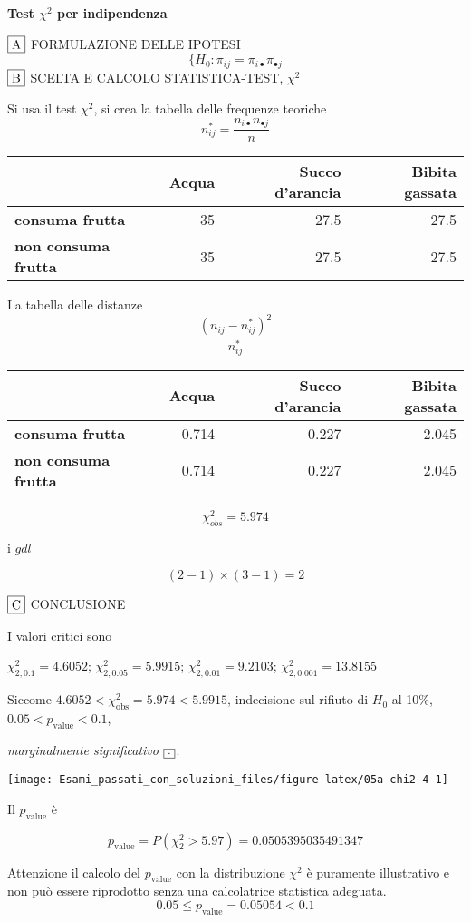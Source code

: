 \documentclass[
  11pt,
]{book}
\theoremstyle{mytheoremstyle}
\theoremstyle{mydefstyle}
\newenvironment{sol}
  {
  \begin{tcolorbox}[enhanced,breakable,arc=0.1mm,boxrule=1pt,colback=white,colframe=iblue,
  title=\bf \fontfamily{lmss}\selectfont \hspace{.5 cm} Soluzione,drop fuzzy shadow]

}{
\end{tcolorbox}
  }
\begin{document}
\begin{sol}
\textbf{Test \(\chi^2\) per indipendenza}

\(\fbox{A}\) FORMULAZIONE DELLE IPOTESI
\[
\Big\{H_0:\pi_{ij}=\pi_{i\bullet}\pi_{\bullet j}
\]
\(\fbox{B}\) SCELTA E CALCOLO STATISTICA-TEST, \(\chi^2\)

Si usa il test \(\chi^2\), si crea la tabella delle frequenze teoriche
\[
n_{ij}^*=\frac{n_{i\bullet}n_{\bullet j}}{n}
\]

\begin{table}[H]
\centering
\begin{tabular}{>{}lrrr}
\toprule
  & Acqua & Succo d'arancia & Bibita gassata\\
\midrule
\textbf{consuma frutta} & 35 & 27.5 & 27.5\\
\textbf{non consuma frutta} & 35 & 27.5 & 27.5\\
\bottomrule
\end{tabular}
\end{table}

La tabella delle distanze
\[
\frac{(n_{ij}-n_{ij}^*)^2}{n_{ij}^*}
\]

\begin{table}[H]
\centering
\begin{tabular}{>{}lrrr}
\toprule
  & Acqua & Succo d'arancia & Bibita gassata\\
\midrule
\textbf{consuma frutta} & 0.714 & 0.227 & 2.045\\
\textbf{non consuma frutta} & 0.714 & 0.227 & 2.045\\
\bottomrule
\end{tabular}
\end{table}

\[
    \chi^2_{obs}= 5.974 
  \]

i \(gdl\)

\[
    ( 2 -1)\times( 3 -1)= 2 
  \]

\(\fbox{C}\) CONCLUSIONE

I valori critici sono

\(\chi^2_{2;0.1}=4.6052\); \(\chi^2_{2;0.05}=5.9915\); \(\chi^2_{2;0.01}=9.2103\); \(\chi^2_{2;0.001}=13.8155\)

Siccome \(4.6052<\chi^2_\text{obs}=5.974<5.9915\), indecisione sul rifiuto di \(H_0\) al 10\%, \(0.05<p_\text{value}<0.1\),

\emph{marginalmente significativo} \(\fbox{.}\).

\begin{center}\texttt{[image: Esami\_passati\_con\_soluzioni\_files/figure-latex/05a-chi2-4-1]} \end{center}

Il \(p_{\text{value}}\) è

\[ p_{\text{value}} = P(\chi^2_{2}>5.97)=0.0505395035491347 \]

Attenzione il calcolo del \(p_\text{value}\) con la distribuzione \(\chi^2\) è puramente illustrativo e non può essere riprodotto senza una calcolatrice statistica adeguata.\[
 0.05 \leq p_\text{value}= 0.05054 < 0.1 
\]

\end{sol}
\end{document}
